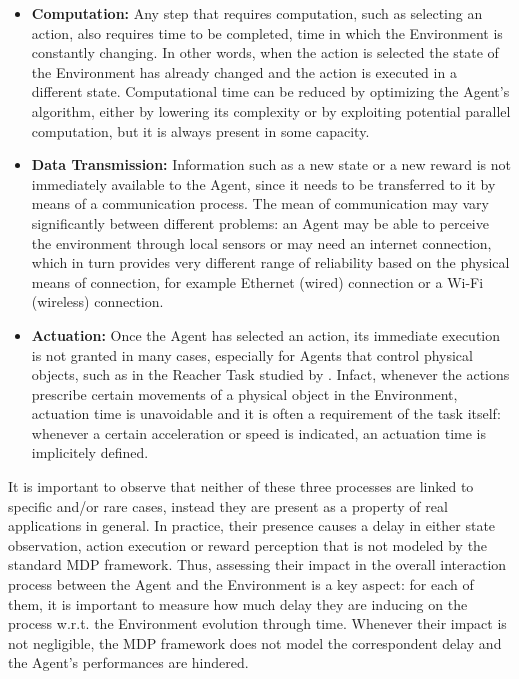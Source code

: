     \begin{itemize}
        \item \textbf{Computation:} Any step that requires computation, such as selecting an action, also requires time to be completed, time in which the Environment is constantly changing. In other words, when the action is selected the state of the Environment has already changed and the action is executed in a different state. Computational time can be reduced by optimizing the Agent's algorithm, either by lowering its complexity or by exploiting potential parallel computation, but it is always present in some capacity.
        \item \textbf{Data Transmission:} Information such as a new state or a new reward is not immediately available to the Agent, since it needs to be transferred to it by means of a communication process. The mean of communication may vary significantly between different problems: an Agent may be able to perceive the environment through local sensors or may need an internet connection, which in turn provides very different range of reliability based on the physical means of connection, for example Ethernet (wired) connection or a Wi-Fi (wireless) connection.
        \item \textbf{Actuation:} Once the Agent has selected an action, its immediate execution is not granted in many cases, especially for Agents that control physical objects, such as in the Reacher Task studied by . Infact, whenever the actions prescribe certain movements of a physical object in the Environment, actuation time is unavoidable and it is often a requirement of the task itself: whenever a certain acceleration or speed is indicated, an actuation time is implicitely defined. 
    \end{itemize}
    \noindent
    It is important to observe that neither of these three processes are linked to specific and/or rare cases, instead they are present as a property of real applications in general. In practice, their presence causes a delay in either state observation, action execution or reward perception that is not modeled by the standard MDP framework. Thus, assessing their impact in the overall interaction process between the Agent and the Environment is a key aspect: for each of them, it is important to measure how much delay they are inducing on the process w.r.t. the Environment evolution through time. Whenever their impact is not negligible, the MDP framework does not model the correspondent delay and the Agent's performances are hindered. 
